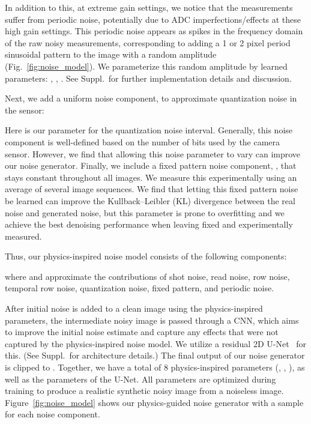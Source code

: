 \documentclass[final]{cvpr}
\begin{document}
In addition to this, at extreme gain settings, we notice that the measurements suffer from periodic noise, potentially due to ADC imperfections/effects at these high gain settings. This periodic noise appears as spikes in the frequency domain of the raw noisy measurements, corresponding to adding a 1 or 2 pixel period sinusoidal pattern to the image with a random amplitude (Fig.~\ref{fig:noise_model}). We parameterize this random amplitude by learned parameters: , , . See Suppl.\ for further implementation details and discussion. 



Next, we add a uniform noise component, to approximate quantization noise in the sensor:

Here  is our parameter for the quantization noise interval. Generally, this noise component is well-defined based on the number of bits used by the camera sensor. However, we find that allowing this noise parameter to vary can improve our noise generator. Finally, we include a fixed pattern noise component, , that stays constant throughout all images. We measure this experimentally using an average of several image sequences. We find that letting this fixed pattern noise be learned can improve the Kullback–Leibler (KL) divergence between the real noise and generated noise, but this parameter is prone to overfitting and we achieve the best denoising performance when leaving  fixed and experimentally measured. 

Thus, our physics-inspired noise model consists of the following components:

where  and  approximate the contributions of shot noise, read noise, row noise, temporal row noise, quantization noise, fixed pattern, and periodic noise.

After initial noise is added to a clean image using the physics-inspired parameters, the intermediate noisy image is passed through a CNN, which aims to improve the initial noise estimate and capture any effects that were not captured by the physics-inspired noise model. We utilize a residual 2D U-Net~\cite{ronneberger2015u} for this. (See Suppl.\ for architecture details.)
The final output of our noise generator is clipped to .
Together, we have a total of 8 physics-inspired parameters (, , ), as well as the parameters of the U-Net. All parameters are optimized during training to produce a realistic synthetic noisy image from a noiseless image. Figure~\ref{fig:noise_model} shows our physics-guided noise generator with a sample for each noise component.
\end{document}

